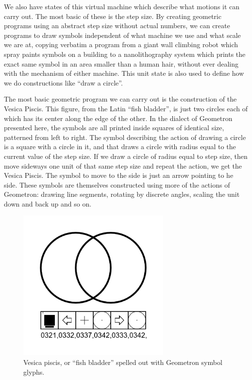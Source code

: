 We also have states of this virtual machine which describe what motions it can carry out.  The most basic of these is the step size.  By creating geometric programs using an abstract step size without actual numbers, we can create programs to draw symbols independent of what machine we use and what scale we are at, copying verbatim a program from a giant wall climbing robot which spray paints symbols on a building to a nanolithography system which prints the exact same symbol in an area smaller than a human hair, without ever dealing with the mechanism of either machine.  This unit state is also used to define how we do constructions like ``draw a circle''.  

The most basic geometric program we can carry out is the construction of the Vesica Piscis.  This figure, from the Latin ``fish bladder'', is just two circles each of which has its center along the edge of the other.  In the dialect of Geometron presented here, the symbols are all printed inside squares of identical size, patterned from left to right.  The symbol describing the action of drawing a circle is a square with a circle in it, and that draws a circle with radius equal to the current value of the step size.  If we draw a circle of radius equal to step size, then move sideways one unit of that same step size and repeat the action, we get the Vesica Piscis. The symbol to move to the side is just an arrow pointing to he side.  These symbols are themselves constructed using more of the actions of Geometron: drawing line segments, rotating by discrete angles, scaling the unit down and back up and so on.

\begin{figure}
	\centering
	\includegraphics[width=3in]{figures/symbol/vesicapiscisspelling.png}
	\caption[vesicapiscis]
	{Vesica piscis, or ``fish bladder'' spelled out with Geometron symbol glyphs.}
\end{figure}

